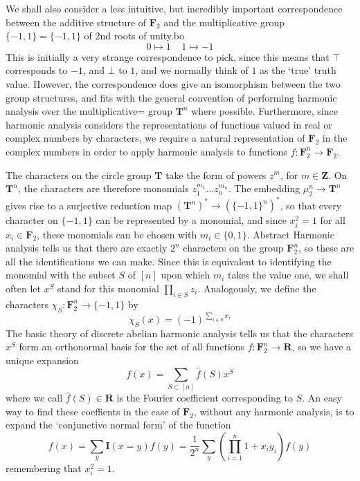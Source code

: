 We shall also consider a less intuitive, but incredibly important correspondence between the additive structure of $\mathbf{F}_2$ and the multiplicative group $\{ -1, 1 \} = \{ -1, 1 \}$ of 2nd roots of unity.bo
%
\[ 0 \mapsto 1\ \ \ \ \ 1 \mapsto -1 \]
%
This is initially a very strange correspondence to pick, since this means that $\top$ corresponds to $-1$, and $\bot$ to $1$, and we normally think of $1$ as the `true' truth value. However, the correspondence does give an isomorphism between the two group structures, and fits with the general convention of performing harmonic analysis over the multiplicative= group $\mathbf{T}^n$ where possible. Furthermore, since harmonic analysis considers the representations of functions valued in real or complex numbers by characters, we require a natural representation of $\mathbf{F}_2$ in the complex numbers in order to apply harmonic analysis to functions $f: \mathbf{F}_2^n \to \mathbf{F}_2$.

The characters on the circle group $\mathbf{T}$ take the form of powers $z^m$, for $m \in \mathbf{Z}$. On $\mathbf{T}^n$, the characters are therefore monomials $z_1^{m_1} \dots z_n^{m_n}$. The embedding $\mu^n_2 \to \mathbf{T}^n$ gives rise to a surjective reduction map $(\mathbf{T}^n)^* \to (\{ -1, 1 \}^n)^*$, so that every character on $\{ -1 , 1 \}$ can be represented by a monomial, and since $x_i^2 = 1$ for all $x_i \in \mathbf{F}_2$, these monomials can be chosen with $m_i \in \{ 0, 1 \}$. Abstract Harmonic analysis tells us that there are exactly $2^n$ characters on the group $\mathbf{F}_2^n$, so these are all the identifications we can make. Since this is equivalent to identifying the monomial with the subset $S$ of $[n]$ upon which $m_i$ takes the value one, we shall often let $x^S$ stand for this monomial $\prod_{i \in S} z_i$. Analogously, we define the characters $\chi_S: \mathbf{F}_2^n \to \{ -1, 1 \}$ by
%
\[ \chi_S(x) = (-1)^{\sum_{i \in S} x_i} \]
%
The basic theory of discrete abelian harmonic analysis tells us that the characters $x^S$ form an orthonormal basis for the set of all functions $f: \mathbf{F}_2^n \to \mathbf{R}$, so we have a unique expansion
%
\[ f(x) = \sum_{S \subset [n]} \widehat{f}(S) x^S \]
%
where we call $\widehat{f}(S) \in \mathbf{R}$ is the Fourier coefficient corresponding to $S$. An easy way to find these coeffients in the case of $\mathbf{F}_2$, without any harmonic analysis, is to expand the `conjunctive normal form' of the function
%
\[ f(x) = \sum_y \mathbf{I}(x = y) f(y) = \frac{1}{2^n} \sum_y \left( \prod_{i = 1}^n 1 + x_iy_i \right) f(y) \]
%
remembering that $x_i^2 = 1$.

